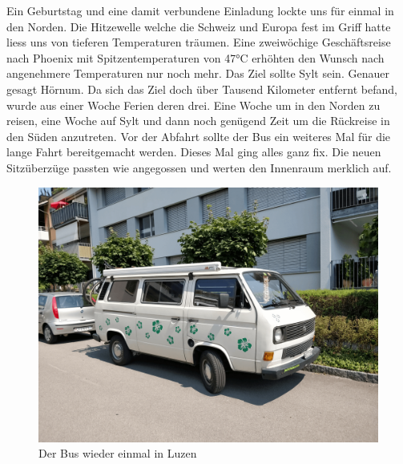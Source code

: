 Ein Geburtstag und eine damit verbundene Einladung lockte uns für einmal in den Norden.
Die Hitzewelle welche die Schweiz und Europa fest im Griff hatte liess uns von tieferen Temperaturen träumen.
Eine zweiwöchige Geschäftsreise nach Phoenix mit Spitzentemperaturen von 47°C erhöhten den Wunsch nach angenehmere Temperaturen nur noch mehr.
Das Ziel sollte Sylt sein.
Genauer gesagt Hörnum.
Da sich das Ziel doch über Tausend Kilometer entfernt befand, wurde aus einer Woche Ferien deren drei.
Eine Woche um in den Norden zu reisen, eine Woche auf Sylt und dann noch genügend Zeit um die Rückreise in den Süden anzutreten. 
Vor der Abfahrt sollte der Bus ein weiteres Mal für die lange Fahrt bereitgemacht werden.
Dieses Mal ging alles ganz fix.
Die neuen Sitzüberzüge passten wie angegossen und werten den Innenraum merklich auf.

\begin{figure}[hb]
    \centering
    \includegraphics[width=\textwidth]{../Bilder/Sylt/2.png}
    \caption{Der Bus wieder einmal in Luzen}
    \label{img:Sylt}
\end{figure}

\newpage
